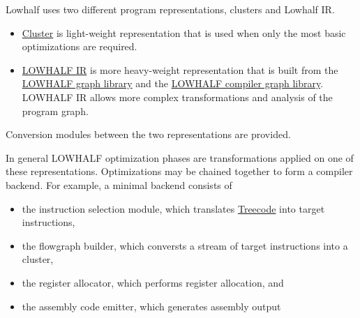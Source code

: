   Lowhalf uses two different program representations, clusters and Lowhalf IR.
\begin{itemize}
  \item \href{cluster.html}{Cluster} is light-weight representation
that is used when only the most basic optimizations are required.
  \item \href{lowhalf-ir.html}{LOWHALF IR} is more heavy-weight
   representation that is built from the 
    \href{graphs.html}{LOWHALF graph library} and the
    \href{compiler-graphs.html}{LOWHALF compiler graph library}.
   LOWHALF IR allows more complex transformations and analysis of the
   program graph.
\end{itemize}
Conversion modules between the two representations are provided.

In general LOWHALF optimization phases are transformations applied on one
of these representations.  Optimizations may be chained together to form
a compiler backend.  For example, a minimal backend consists of
\begin{itemize}
  \item the instruction selection module, which translates 
\href{treecode.html}{Treecode} into target instructions,
  \item the flowgraph builder, which conversts a stream of target instructions
   into a cluster,
  \item the register allocator, which performs register allocation, and
  \item the assembly code emitter, which generates assembly output
\end{itemize}
